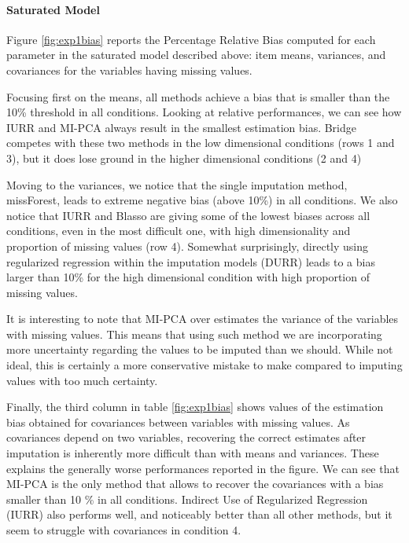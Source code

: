	\paragraph{Saturated Model} Figure \ref{fig:exp1bias} reports the Percentage Relative Bias computed 
	for each parameter in the saturated model described above: item means, variances, and covariances for
	the variables having missing values.

	Focusing first on the means, all methods achieve a bias that is smaller than the 10\% threshold 
	in all conditions.
	Looking at relative performances, we can see how IURR and MI-PCA always result in the smallest
	estimation bias. 
	Bridge competes with these two methods in the low dimensional conditions (rows 1 and 3), but it 
	does lose ground in the higher dimensional conditions (2 and 4)

	Moving to the variances, we notice that the single imputation method, missForest, leads to extreme 
	negative bias (above 10\%) in all conditions.
	We also notice that IURR and Blasso are giving some of the lowest biases across all conditions, even in 
	the most difficult one, with high dimensionality and proportion of missing values (row 4).
	Somewhat surprisingly, directly using regularized regression within the imputation models (DURR) leads
	to a bias larger than 10\% for the high dimensional condition with high proportion of missing values.
	
	It is interesting to note that MI-PCA over estimates the variance of the variables with missing values.
	This means that using such method we are incorporating more uncertainty regarding the values to be imputed
	than we should. While not ideal, this is certainly a more conservative mistake to make compared to imputing
	values with too much certainty.
	
	Finally, the third column in table \ref{fig:exp1bias} shows values of the estimation bias obtained for 
	covariances between variables with missing values. 
	As covariances depend on two variables, recovering the correct estimates after imputation is inherently 
	more difficult than with means and variances.
	These explains the generally worse performances reported in the figure. 
	We can see that MI-PCA is the only method that allows to recover the covariances with a bias smaller 
	than 10 \% in all conditions.
	Indirect Use of Regularized Regression (IURR) also performs well, and noticeably better than all other
	methods, but it seem to struggle with covariances in condition 4.

